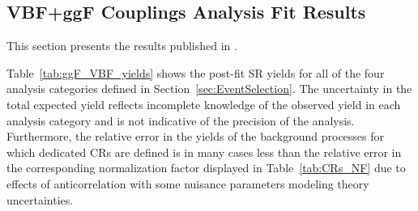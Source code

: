 \newcommand{\paperfiguredir}{figures/paper-figures}
\subsection{\HWW VBF+ggF Couplings Analysis Fit Results}
This section presents the results published in . 




Table~\ref{tab:ggF_VBF_yields} shows the post-fit SR yields for all of the four analysis categories defined in Section~\ref{sec:EventSelection}. The uncertainty in the total expected yield reflects incomplete knowledge of the observed yield in each analysis category and is not indicative of the precision of the analysis.
Furthermore, the relative error in the yields of the background processes for which dedicated CRs are defined is in many cases less than the relative error in the corresponding normalization factor displayed in Table~\ref{tab:CRs_NF} due to effects of anticorrelation with some nuisance parameters modeling theory uncertainties.


